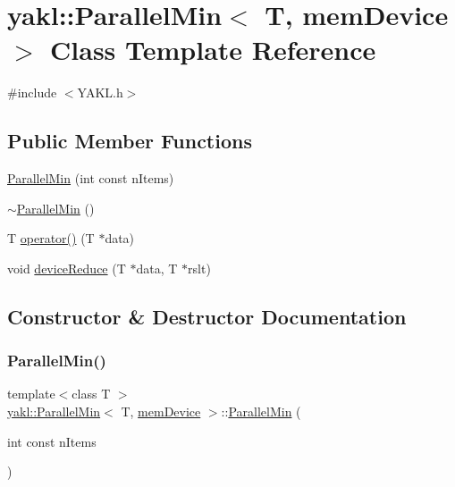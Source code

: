 \hypertarget{classyakl_1_1ParallelMin_3_01T_00_01memDevice_01_4}{}\section{yakl\+:\+:Parallel\+Min$<$ T, mem\+Device $>$ Class Template Reference}
\label{classyakl_1_1ParallelMin_3_01T_00_01memDevice_01_4}


{\ttfamily \#include $<$Y\+A\+K\+L.\+h$>$}

\subsection*{Public Member Functions}
\begin{DoxyCompactItemize}
\item 
\hyperlink{classyakl_1_1ParallelMin_3_01T_00_01memDevice_01_4_a65079fe60e2e9464efe6b22cb1760756}{Parallel\+Min} (int const n\+Items)
\item 
\hyperlink{classyakl_1_1ParallelMin_3_01T_00_01memDevice_01_4_a1f4e9f01b1ee74f370219a36d37657d8}{$\sim$\+Parallel\+Min} ()
\item 
T \hyperlink{classyakl_1_1ParallelMin_3_01T_00_01memDevice_01_4_ab0aa323eb3332089954b0d2941383cb5}{operator()} (T $\ast$data)
\item 
void \hyperlink{classyakl_1_1ParallelMin_3_01T_00_01memDevice_01_4_a5a27d51468461028e0b88a747c75e782}{device\+Reduce} (T $\ast$data, T $\ast$rslt)
\end{DoxyCompactItemize}


\subsection{Constructor \& Destructor Documentation}
\mbox{\label{classyakl_1_1ParallelMin_3_01T_00_01memDevice_01_4_a65079fe60e2e9464efe6b22cb1760756}} 
\subsubsection{\texorpdfstring{Parallel\+Min()}{ParallelMin()}}
{\footnotesize\ttfamily template$<$class T $>$ \\
\hyperlink{classyakl_1_1ParallelMin}{yakl\+::\+Parallel\+Min}$<$ T, \hyperlink{namespaceyakl_ac3c32aec58c61e7f870081477ceee883}{mem\+Device} $>$\+::\hyperlink{classyakl_1_1ParallelMin}{Parallel\+Min} (\begin{DoxyParamCaption}\item[{int const}]{n\+Items }\end{DoxyParamCaption})\hspace{0.3cm}{\ttfamily [inline]}}

